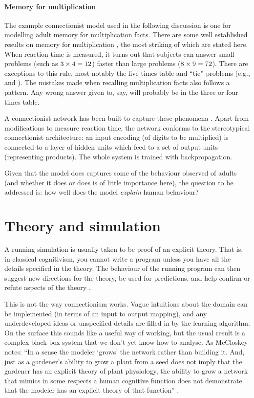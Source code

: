 \paragraph{Memory for multiplication}  The example connectionist model used
in the following discussion is one for modelling adult memory for
multiplication facts.
There are some well established results on memory for
multiplication \cite{camp85},
the most striking of which are stated here.
When reaction time is measured, it turns out that subjects can
answer small problems (such as $\mbox{$3\times4$}=12$) faster than large problems
($\mbox{$8\times9$}=72$). There are exceptions to this rule, most notably the five
times table and ``tie'' problems (e.g., 
and ). The mistakes made when
recalling multiplication facts also follows a pattern.  Any wrong answer
given to, say,  will probably be in the three or four times table.

A connectionist network has been built to capture these phenomena
\cite{dallmemo}.  Apart from modifications to measure reaction time, the
network conforms to the stereotypical connectionist architecture: an input
encoding (of digits to be multiplied) is connected to a layer of hidden
units which feed to a set of output units (representing products).  The
whole system is trained with backpropagation.

Given that the model does captures some of the behaviour observed of adults
(and whether it does or does is of little importance here), the
question to be addressed is: how well does the model {\em explain} human
behaviour?

\section*{Theory and simulation}

A running simulation is usually taken to be proof of an explicit
theory.  That is, in classical cognitivism, you cannot write a program
unless you have all the details specified in the theory. The behaviour of
the running program can then suggest new directions for the theory, be used
for predictions, and help confirm or refute aspects of the theory
\cite{newecomp}.

This is not the way connectionism works. Vague intuitions about the domain
can be implemented (in terms of an input to output mapping), and any
underdeveloped ideas or unspecified details are filled in by the learning
algorithm. On the surface this sounds like a useful way of working, but the
usual result is a complex black-box system that we don't yet know how to
analyse.  As McCloskey notes: ``In a sense the modeler `grows' the network
rather than building it.  And, just as a gardener's ability to grow a plant
from a seed does not imply that the gardener has an explicit theory of
plant physiology, the ability to grow a network that mimics in some
respects a human cognitive function does not demonstrate that the modeler
has an explicit theory of that function'' \citeyear[p.~391]{mcclnetw}.


